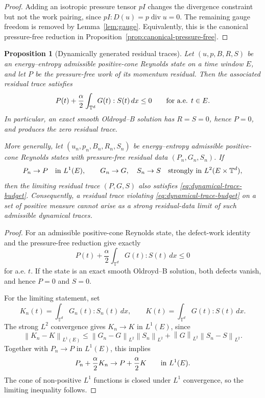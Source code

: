 \documentclass[11pt]{article}
\numberwithin{equation}{section}
\newtheorem{proposition}[theorem]{Proposition}
\newcommand{\T}{\mathbb T}
\newcommand{\Id}{I}
\newcommand{\divv}{\operatorname{div}}
\newcommand{\norm}[1]{\left\lVert #1\right\rVert}
\begin{document}
\begin{proof}
Adding an isotropic pressure tensor \(p\Id\) changes the divergence constraint
but not the work pairing, since \(p\Id:D(u)=p\divv u=0\).  The remaining
gauge freedom is removed by Lemma~\ref{lem:gauge}.  Equivalently, this is the
canonical pressure-free reduction in
Proposition~\ref{prop:canonical-pressure-free}.
\end{proof}

\begin{proposition}[Dynamically generated residual traces]
\label{prop:dynamical-residual-traces}
Let \((u,p,B,R,S)\) be an energy--entropy admissible positive-cone Reynolds
state on a time window \(E\), and let \(P\) be the pressure-free work of its
momentum residual.  Then the associated residual trace satisfies
\begin{equation}
  P(t)+\frac{\alpha}{2}\int_{\T^d}G(t):S(t)\,dx\le0
  \qquad\hbox{for a.e. }t\in E .
  \label{eq:dynamical-trace-budget}
\end{equation}
In particular, an exact smooth Oldroyd--B solution has \(R=S=0\), hence
\(P=0\), and produces the zero residual trace.

More generally, let \((u_n,p_n,B_n,R_n,S_n)\) be energy--entropy admissible
positive-cone Reynolds states with pressure-free residual data
\((P_n,G_n,S_n)\).  If
\[
  P_n\to P\quad\hbox{in }L^1(E),\qquad
  G_n\to G,\quad S_n\to S
  \quad\hbox{strongly in }L^2(E\times\T^d),
\]
then the limiting residual trace \((P,G,S)\) also satisfies
\eqref{eq:dynamical-trace-budget}.  Consequently, a residual trace violating
\eqref{eq:dynamical-trace-budget} on a set of positive measure cannot arise as
a strong residual-data limit of such admissible dynamical traces.
\end{proposition}

\begin{proof}
For an admissible positive-cone Reynolds state, the defect-work identity and
the pressure-free reduction give exactly
\[
  P(t)+\frac{\alpha}{2}\int_{\T^d}G(t):S(t)\,dx\le0
\]
for a.e. \(t\).  If the state is an exact smooth Oldroyd--B solution, both
defects vanish, and hence \(P=0\) and \(S=0\).

For the limiting statement, set
\[
  K_n(t)=\int_{\T^d}G_n(t):S_n(t)\,dx,\qquad
  K(t)=\int_{\T^d}G(t):S(t)\,dx .
\]
The strong \(L^2\) convergence gives \(K_n\to K\) in \(L^1(E)\), since
\[
  \norm{K_n-K}_{L^1(E)}
  \le
  \norm{G_n-G}_{L^2}\norm{S_n}_{L^2}
  +\norm{G}_{L^2}\norm{S_n-S}_{L^2}.
\]
Together with \(P_n\to P\) in \(L^1(E)\), this implies
\[
  P_n+\frac{\alpha}{2}K_n
  \to
  P+\frac{\alpha}{2}K
  \qquad\hbox{in }L^1(E).
\]
The cone of non-positive \(L^1\) functions is closed under \(L^1\) convergence,
so the limiting inequality follows.
\end{proof}
\end{document}
